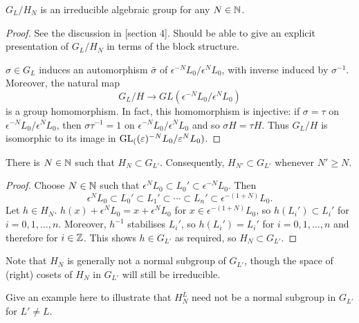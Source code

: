 \documentclass[a4paper, 11pt]{report}
\begin{document}
\begin{lemma}\label{lemma:algebraic-quotient-group}
$G_L/H_N$ is an irreducible algebraic group for any $N\in\mathbb{N}$.
\end{lemma}

{\color{blue}
\begin{proof}
See the discussion in \cite{lusztig99}[section 4]. Should be able to give an explicit presentation of $G_L/H_N$ in terms of the block structure.

$\sigma\in G_L$ induces an automorphism $\bar{\sigma}$ of $\epsilon^{-N} L_0/{\epsilon^N L_0}$, with inverse induced by $\sigma^{-1}$. Moreover, the natural map
\begin{equation*}
G_L/H \to GL(\epsilon^{-N}L_0/{\epsilon^N L_0})
\end{equation*}
is a group homomorphism. In fact, this homomorphism is injective: if $\sigma = \tau$ on $\epsilon^{-N}L_0/{\epsilon^N L_0}$, then $\sigma\tau^{-1} = 1$ on $\epsilon^{-N}L_0/{\epsilon^N L_0}$ and so $\sigma H = \tau H$. Thus $G_L/H$ is isomorphic to its image in $\operatorname{GL}_{(}(\varepsilon)^{-N}L_0/{\varepsilon^N L_0})$.
\end{proof}
}

\begin{lemma}
There is $N\in\mathbb{N}$ such that $H_N\subset G_{L'}$. Consequently, $H_{N'}\subset G_{L'}$ whenever $N'\geq N$.
\end{lemma}

\begin{proof}
Choose $N\in\mathbb{N}$ such that $\epsilon^N L_0\subset L_0'\subset \epsilon^{-N}L_0$. Then
\begin{equation*}
\epsilon^N L_0 \subset L_0'\subset L_1'\subset\cdots\subset L_n' \subset \epsilon^{-(1+N)}L_0.
\end{equation*}
Let $h\in H_N$. $h(x) + \epsilon^N L_0 = x + \epsilon^N L_0$ for $x\in\epsilon^{-(1+N)} L_0$, so $h(L_i')\subset L_i'$ for $i=0,1,\ldots,n$. Moreover, $h^{-1}$ stabilises $L_i'$, so $h(L_i') = L_i'$ for $i=0,1,\ldots,n$ and therefore for $i\in\mathbb{Z}$. This shows $h\in G_{L'}$ as required, so $H_N\subset G_{L'}$.
\end{proof}

Note that $H_N$ is generally not a normal subgroup of $G_{L'}$, though the space of (right) cosets of $H_N$ in $G_{L'}$ will still be irreducible.

\begin{example}
{\color{blue}Give an example here to illustrate that $H_N^L$ need not be a normal subgroup in $G_{L'}$ for $L'\neq L$.}
\end{example}
\end{document}
